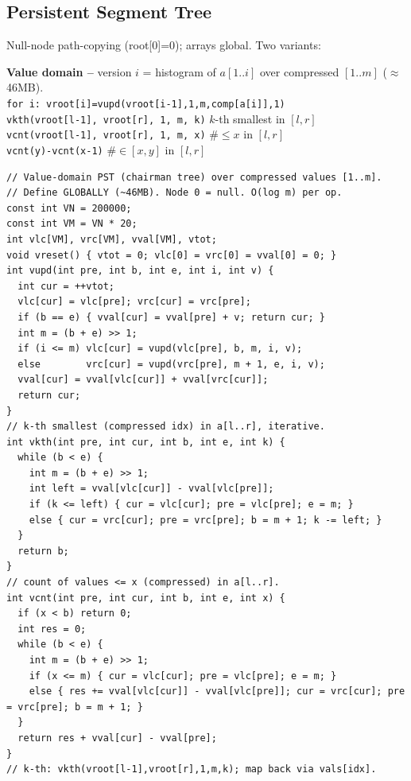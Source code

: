 \subsection{Persistent Segment Tree}
Null-node path-copying (root[0]=0); arrays global. Two variants:

\textbf{Value domain --} version $i$ = histogram of $a[1..i]$ over compressed $[1..m]$ ($\approx$46MB). \\
\texttt{for i: vroot[i]=vupd(vroot[i-1],1,m,comp[a[i]],1)} \\
\texttt{vkth(vroot[l-1], vroot[r], 1, m, k)} \hfill $k$-th smallest in $[l,r]$ \\
\texttt{vcnt(vroot[l-1], vroot[r], 1, m, x)} \hfill $\# \le x$ in $[l,r]$ \\
\texttt{vcnt(y)-vcnt(x-1)} \hfill $\# \in [x,y]$ in $[l,r]$

\begin{verbatim}
// Value-domain PST (chairman tree) over compressed values [1..m].
// Define GLOBALLY (~46MB). Node 0 = null. O(log m) per op.
const int VN = 200000;
const int VM = VN * 20;
int vlc[VM], vrc[VM], vval[VM], vtot;
void vreset() { vtot = 0; vlc[0] = vrc[0] = vval[0] = 0; }
int vupd(int pre, int b, int e, int i, int v) {
  int cur = ++vtot;
  vlc[cur] = vlc[pre]; vrc[cur] = vrc[pre];
  if (b == e) { vval[cur] = vval[pre] + v; return cur; }
  int m = (b + e) >> 1;
  if (i <= m) vlc[cur] = vupd(vlc[pre], b, m, i, v);
  else        vrc[cur] = vupd(vrc[pre], m + 1, e, i, v);
  vval[cur] = vval[vlc[cur]] + vval[vrc[cur]];
  return cur;
}
// k-th smallest (compressed idx) in a[l..r], iterative.
int vkth(int pre, int cur, int b, int e, int k) {
  while (b < e) {
    int m = (b + e) >> 1;
    int left = vval[vlc[cur]] - vval[vlc[pre]];
    if (k <= left) { cur = vlc[cur]; pre = vlc[pre]; e = m; }
    else { cur = vrc[cur]; pre = vrc[pre]; b = m + 1; k -= left; }
  }
  return b;
}
// count of values <= x (compressed) in a[l..r].
int vcnt(int pre, int cur, int b, int e, int x) {
  if (x < b) return 0;
  int res = 0;
  while (b < e) {
    int m = (b + e) >> 1;
    if (x <= m) { cur = vlc[cur]; pre = vlc[pre]; e = m; }
    else { res += vval[vlc[cur]] - vval[vlc[pre]]; cur = vrc[cur]; pre = vrc[pre]; b = m + 1; }
  }
  return res + vval[cur] - vval[pre];
}
// k-th: vkth(vroot[l-1],vroot[r],1,m,k); map back via vals[idx].
\end{verbatim}

